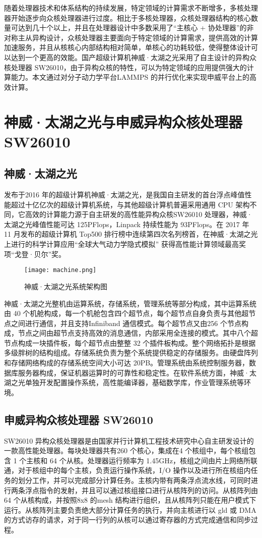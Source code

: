随着处理器技术和体系结构的持续发展，特定领域的计算需求不断增多，多核处理器开始逐步向众核处理器进行过度。相比于多核处理器，众核处理器结构的核心数量可达到几十个以上，并且在处理器设计中多数采用了“主核心 + 协处理器”的非对称主从异构设计，众核处理器主要面向于特定领域的计算需求，提供高效的计算加速服务，并且从核核心内部结构相对简单，单核心的功耗较低，使得整体设计可以达到一个更高的效能。国产超级计算机神威·太湖之光采用了自主设计的异构众核处理器 SW26010，由于异构众核的特性，可以为特定领域的应用提供强大的计算能力。本文通过对分子动力学平台LAMMPS 的并行优化来实现申威平台上的高效计算。
\section{神威·太湖之光与申威异构众核处理器 SW26010}
\subsection{神威·太湖之光}
发布于2016 年的超级计算机神威·太湖之光\cite{fu2016sunway}，是我国自主研发的首台浮点峰值性能超过十亿亿次的超级计算机系统，与其他超级计算机普遍采用通用 CPU 架构不同，它高效的计算能力源于自主研发的高性能异构众核SW26010 处理器，神威·太湖之光峰值性能可达 125PFlops，Linpack 持续性能为 93PFlops。在 2017 年 11 月发布的超级计算机 Top500 排行榜中连续第四次名列榜首，在神威·太湖之光上进行的科学计算应用“全球大气动力学隐式模拟”\cite{yang201610m} 获得高性能计算领域最高奖项“戈登·贝尔”奖。

 \begin{figure}[h]
  \centering
  \texttt{[image: machine.png]}
  \caption{神威·太湖之光系统架构图}
\end{figure}

神威·太湖之光整机由运算系统，存储系统，管理系统等部分构成\cite{dongarra2016report}，其中运算系统由 40 个机舱构成，每一个机舱包含四个超节点，每个超节点自身负责与其他超节点之间进行通信，并且支持Infiniband 通信模式。每个超节点又由256 个节点构成，节点之间由超节点支持高效的消息通信，内部采用全连接的模式。其中八个超节点构成一块插件板，每个超节点由整整 32 个插件板构成。整个网络拓扑是根据多级胖树的结构组成。存储系统负责为整个系统提供稳定的存储服务。由硬盘阵列和存储网络构成的存储系统空间大小可达 20PB。管理系统由系统控制服务器，数据库服务器构成，保证机器运算时的可靠性和稳定性。在软件系统方面，神威·太湖之光单独开发配置操作系统，高性能编译器，基础数学库，作业管理系统等环境。
\subsection{申威异构众核处理器 SW26010}
SW26010 异构众核处理器是由国家并行计算机工程技术研究中心自主研发设计的一款高性能处理器\cite{lin2018evaluating}。每块处理器共有260 个核心，集成在4 个核组中，每个核组包含 1 个主核和 64 个从核。处理器运行频率为 1.45GHz，核组之间由片上网络所联通，对于核组中的每个主核，负责运行操作系统，I/O 操作以及进行所在核组内任务的划分工作，并可以完成部分计算任务。主核内带有两条浮点流水线，可同时进行两条浮点指令的发射，并且可以通过核组接口进行从核阵列的访问。从核阵列由64 个从核构成，并按照8x8 的mesh 结构进行组织，且从核阵列只能在用户模式下运行。从核阵列主要负责绝大部分计算任务的执行，并向主核进行以 gld 或 DMA 的方式访存的请求，对于同一行列的从核可以通过寄存器的方式完成通信和同步过程。

